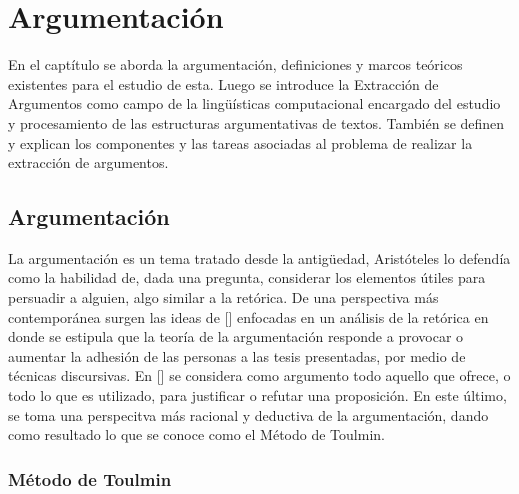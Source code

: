 \chapter{Argumentación}\label{chapter:argumentation}

En el captítulo se aborda la argumentación, definiciones y marcos teóricos existentes para el estudio de esta.
Luego se introduce la Extracción de Argumentos como campo de la lingüísticas computacional encargado del estudio 
y procesamiento de las estructuras argumentativas de textos. También se definen y explican los componentes y las tareas 
asociadas al problema de realizar la extracción de argumentos.

\section{Argumentación}

La argumentación es un tema tratado desde la antigüedad, Aristóteles lo defendía como la 
habilidad de, dada una pregunta, considerar los elementos útiles para persuadir a alguien, algo
similar a la retórica. De una perspectiva más contemporánea surgen las ideas de 
[\cite{perelman1969rhetoric}] 
enfocadas en un análisis de la retórica en donde se estipula que la teoría de la argumentación
responde a provocar o aumentar la adhesión de las personas a las tesis presentadas, por medio de 
técnicas discursivas. En 
[\cite{toulmin_2003}] 
se considera como argumento todo aquello que ofrece, 
o todo lo que es utilizado, para justificar o refutar una proposición. En este último, se toma 
una perspecitva más racional y deductiva de la argumentación, dando como resultado lo que se 
conoce como el Método de Toulmin. 

\subsection{Método de Toulmin}

